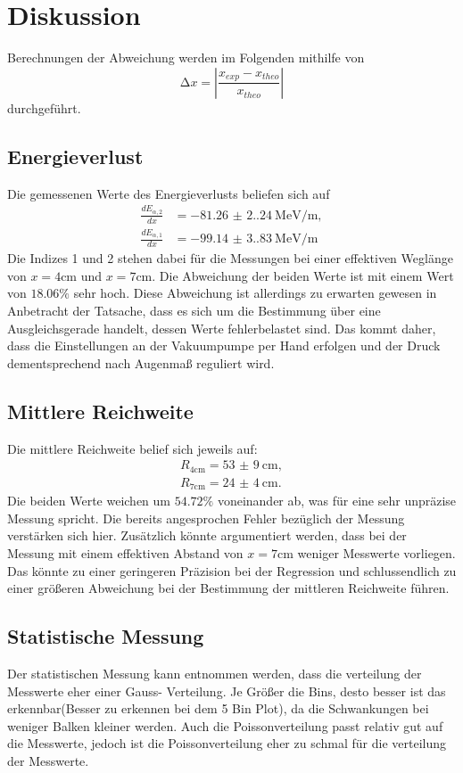 \section{Diskussion}
\label{sec:Diskussion}

Berechnungen der Abweichung werden im Folgenden mithilfe von 
\begin{equation*}
    \increment x = \left| \frac{x_{exp}-x_{theo}}{x_{theo}} \right|
\end{equation*}
durchgeführt.

\subsection{Energieverlust}
Die gemessenen Werte des Energieverlusts beliefen sich auf 
\begin{align*}
    \frac{dE_{\alpha,2}}{dx} &= \qty{-81.26(2.24)}{\mega\electronvolt\per\meter}, \\
    \frac{dE_{\alpha,1}}{dx} &= \qty{-99.14(3.83)}{\mega\electronvolt\per\meter}
\end{align*}
Die Indizes 1 und 2 stehen dabei für die Messungen bei einer effektiven 
Weglänge von $x = 4 \unit{\centi\meter}$ und $x = 7 \unit{\centi\meter}$.
Die Abweichung der beiden Werte ist mit einem Wert von $18.06 \%$ sehr hoch.
Diese Abweichung ist allerdings zu erwarten gewesen in Anbetracht der Tatsache, 
dass es sich um die Bestimmung über eine Ausgleichsgerade handelt, dessen Werte 
fehlerbelastet sind. Das kommt daher, dass die Einstellungen an der Vakuumpumpe 
per Hand erfolgen und der Druck dementsprechend nach Augenmaß reguliert wird.

\subsection{Mittlere Reichweite}
Die mittlere Reichweite belief sich jeweils auf:
\begin{align}
    R_\text{4cm} = \qty{53(9)}{\centi\meter}, \\
    R_\text{7cm} = \qty{24(4)}{\centi\meter}.
\end{align}
Die beiden Werte weichen um $54.72 \%$ voneinander ab, was für eine sehr 
unpräzise Messung spricht. Die bereits angesprochen Fehler bezüglich der Messung 
verstärken sich hier. Zusätzlich könnte argumentiert werden, dass bei der 
Messung mit einem effektiven Abstand von $x = 7 \unit{\centi\meter}$ weniger
Messwerte vorliegen. Das könnte zu einer geringeren Präzision bei der Regression 
und schlussendlich zu einer größeren Abweichung bei der Bestimmung der mittleren 
Reichweite führen.

\subsection{Statistische Messung}
Der statistischen Messung kann entnommen werden, dass die verteilung der Messwerte eher einer Gauss-
Verteilung. Je Größer die Bins, desto besser ist das erkennbar(Besser zu erkennen bei dem 5 Bin Plot), da die Schwankungen bei weniger Balken kleiner werden.
Auch die Poissonverteilung passt relativ gut auf die Messwerte, jedoch ist die Poissonverteilung eher zu schmal 
für die verteilung der Messwerte. 